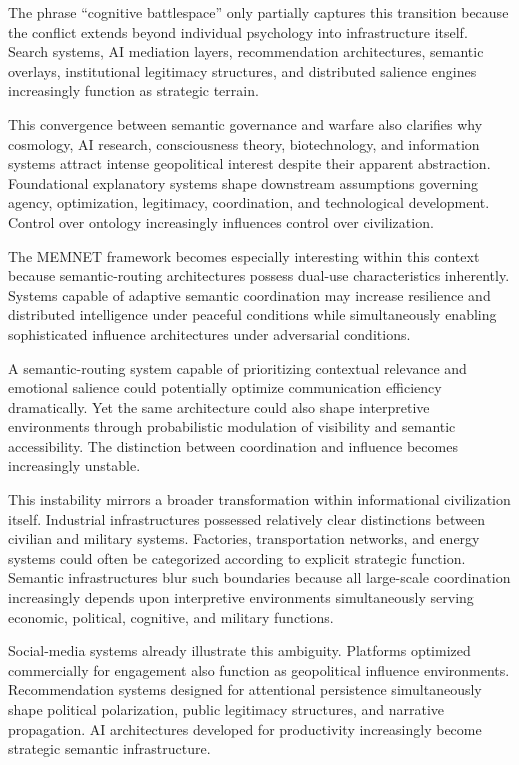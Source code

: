 \documentclass[11pt,a4paper]{article}
\begin{document}
The phrase ``cognitive battlespace'' only partially captures this transition because the conflict extends beyond individual psychology into infrastructure itself. Search systems, AI mediation layers, recommendation architectures, semantic overlays, institutional legitimacy structures, and distributed salience engines increasingly function as strategic terrain.

This convergence between semantic governance and warfare also clarifies why cosmology, AI research, consciousness theory, biotechnology, and information systems attract intense geopolitical interest despite their apparent abstraction. Foundational explanatory systems shape downstream assumptions governing agency, optimization, legitimacy, coordination, and technological development. Control over ontology increasingly influences control over civilization.

The MEMNET framework becomes especially interesting within this context because semantic-routing architectures possess dual-use characteristics inherently. Systems capable of adaptive semantic coordination may increase resilience and distributed intelligence under peaceful conditions while simultaneously enabling sophisticated influence architectures under adversarial conditions.

A semantic-routing system capable of prioritizing contextual relevance and emotional salience could potentially optimize communication efficiency dramatically. Yet the same architecture could also shape interpretive environments through probabilistic modulation of visibility and semantic accessibility. The distinction between coordination and influence becomes increasingly unstable.

This instability mirrors a broader transformation within informational civilization itself. Industrial infrastructures possessed relatively clear distinctions between civilian and military systems. Factories, transportation networks, and energy systems could often be categorized according to explicit strategic function. Semantic infrastructures blur such boundaries because all large-scale coordination increasingly depends upon interpretive environments simultaneously serving economic, political, cognitive, and military functions.

Social-media systems already illustrate this ambiguity. Platforms optimized commercially for engagement also function as geopolitical influence environments. Recommendation systems designed for attentional persistence simultaneously shape political polarization, public legitimacy structures, and narrative propagation. AI architectures developed for productivity increasingly become strategic semantic infrastructure.
\end{document}
